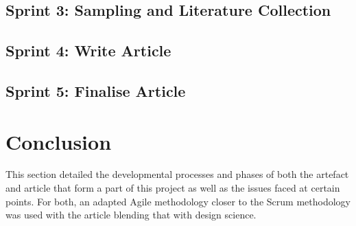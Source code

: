 \subsection{Sprint 3: Sampling and Literature Collection}


\subsection{Sprint 4: Write Article}


\subsection{Sprint 5: Finalise Article}




\section{Conclusion}
This section detailed the developmental processes and phases of both the artefact and article that form a part of this project as well as the issues faced at certain points. For both, an adapted Agile methodology closer to the Scrum methodology was used with the article blending that with design science.
